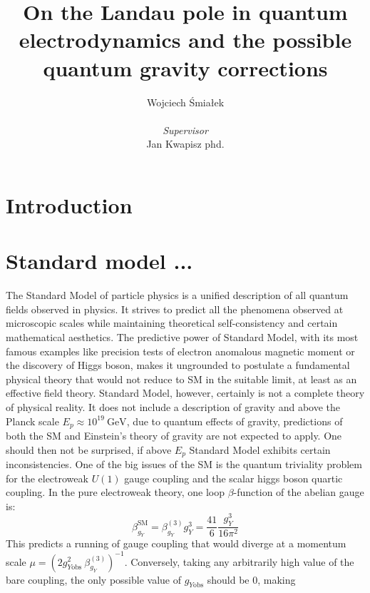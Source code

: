 \documentclass[11pt, a4paper]{article}
\title{\vspace{-2cm}On the Landau pole in quantum electrodynamics and the possible quantum gravity corrections}
\author{{Wojciech Śmiałek}\\
\\
{\textit{Supervisor}} \\
{Jan Kwapisz phd.}}
\date{}
\begin{document}
\maketitle

\section*{Introduction}

\section{Standard model ...}
The Standard Model of particle physics is a unified description of all quantum fields observed in physics. 
It strives to predict all the phenomena observed at microscopic scales while maintaining theoretical
self-consistency and certain mathematical aesthetics. The predictive power of Standard Model, with its most
famous examples like precision tests of electron anomalous magnetic moment or the discovery of Higgs boson,
makes it ungrounded to postulate a fundamental physical theory that would not reduce to SM in the suitable limit, at least
as an effective field theory.
Standard Model, however, certainly is not a complete theory of physical reality. It does not include a description
of gravity and above the Planck scale $E_p \approx 10^{19} \ \text{GeV}$, due to quantum effects of gravity,
predictions of both the SM and Einstein's theory of gravity are not expected to apply.
One should then not be surprised, if above $E_p$ Standard Model exhibits certain inconsistencies.
One of the big issues of the SM is the quantum triviality problem for the electroweak $U(1)$ gauge coupling and
the scalar higgs boson quartic coupling.
In the pure electroweak theory, one loop $\beta$-function of the abelian gauge \cite{higgs mass} is:%
\begin{equation}
    \beta_{g_Y}^{\text{SM}} = \beta_{g_Y}^{(3)} g_Y^3 = \frac{41}{6} \frac{g_Y^3}{16 \pi^2}
\end{equation}
This predicts a running of gauge coupling that would diverge at a momentum scale $\mu = \left(2 g_{Y\text{obs}}^2 \ \beta_{g_Y}^{(3)} \right)^{-1} $.
Conversely, taking any arbitrarily high value of the bare coupling, the only possible value of $g_{Y\text{obs}}$ should be 0, making
\end{document}
